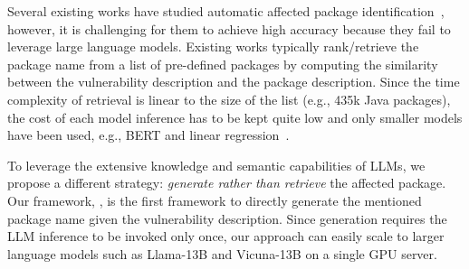 
Several existing works have studied automatic affected package identification~\cite{fastxml, viem, lightxml, chronos, vullibminer}, however, it is challenging for them to achieve high accuracy because they fail to leverage large language models. Existing works typically rank/retrieve the package name from a list of pre-defined packages by computing the similarity between the vulnerability description and the package description. Since the time complexity of retrieval is linear to the size of the list (e.g., 435k Java packages), the cost of each model inference has to be kept quite low and only smaller models have been used, e.g., BERT and linear regression~\cite{fastxml,chronos,lightxml,vullibminer}. 

To leverage the extensive knowledge and semantic capabilities of LLMs, we propose a different strategy: \emph{generate rather than retrieve} the affected package. Our framework, \detector{}, is the first framework to directly generate the mentioned package name given the vulnerability description. Since generation requires the LLM inference to be invoked only once, our approach can easily scale to larger language models such as Llama-13B and Vicuna-13B on a single GPU server. 


